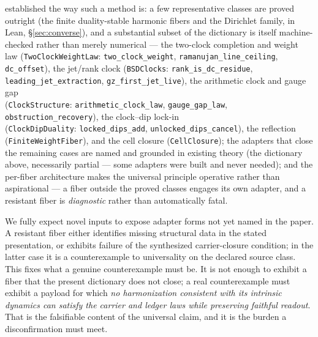 \documentclass[11pt]{article}
\theoremstyle{definition}
\begin{document}
established the way such a method is: a few representative classes are proved outright (the finite
duality-stable harmonic fibers and the Dirichlet family, in Lean, \S\ref{sec:converse}), and a substantial
subset of the dictionary is itself machine-checked rather than merely numerical --- the two-clock
completion and weight law (\texttt{TwoClockWeightLaw}: \texttt{two\_clock\_weight},
\texttt{ramanujan\_line\_ceiling}, \texttt{dc\_offset}), the jet/rank clock (\texttt{BSDClocks}:
\texttt{rank\_is\_dc\_residue}, \texttt{leading\_jet\_extraction}, \texttt{gz\_first\_jet\_live}), the
arithmetic clock and gauge gap \\ (\texttt{ClockStructure}: \texttt{arithmetic\_clock\_law},
\texttt{gauge\_gap\_law}, \texttt{obstruction\_recovery}), the clock--dip lock-in \\(\texttt{ClockDipDuality}:
\texttt{locked\_dips\_add}, \texttt{unlocked\_dips\_cancel}), the reflection (\texttt{FiniteWeightFiber}),
and the cell closure (\texttt{CellClosure}); the adapters that close the remaining cases are named and
grounded in existing theory (the dictionary above, necessarily partial --- some adapters were built and
never needed); and the per-fiber architecture makes the universal principle
operative rather than aspirational --- a fiber outside the proved classes engages its own adapter, and a resistant fiber is
\emph{diagnostic} rather than automatically fatal.

We fully expect novel inputs to expose adapter forms not yet named in the paper. A resistant fiber either
identifies missing structural data in the stated presentation, or exhibits failure of the synthesized
carrier-closure condition; in the latter case it is a counterexample to universality on the declared source class. This fixes what
a genuine counterexample must be. It is not enough to exhibit a fiber that the present dictionary does not
close; a real counterexample must exhibit a payload for which \emph{no harmonization consistent with its
intrinsic dynamics can satisfy the carrier and ledger laws while preserving faithful readout}. That is the
falsifiable content of the universal claim, and it is the burden a disconfirmation must meet.
\end{document}
